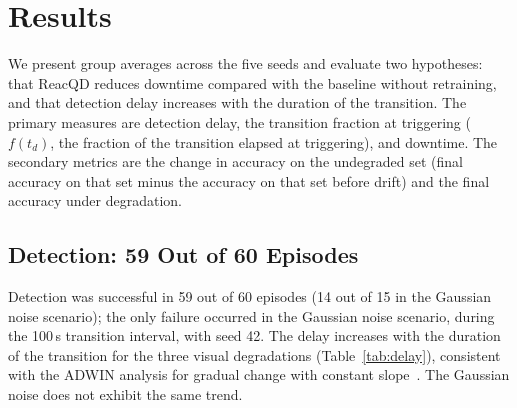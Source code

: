 \documentclass[conference]{IEEEtran}
\begin{document}
\begin{table}[!t]
\centering
\caption{Fixed configuration for each episode.}
\label{tab:setup}
\end{table}
\section{Results}
We present group averages across the five seeds and evaluate two hypotheses: that ReacQD reduces downtime compared with the baseline without retraining, and that detection delay increases with the duration of the transition. The primary measures are detection delay, the transition fraction at triggering ($f(t_d)$, the fraction of the transition elapsed at triggering), and downtime. The secondary metrics are the change in accuracy on the undegraded set (final accuracy on that set minus the accuracy on that set before drift) and the final accuracy under degradation.

\subsection{Detection: 59 Out of 60 Episodes}
Detection was successful in 59 out of 60 episodes (14 out of 15 in the Gaussian noise scenario); the only failure occurred in the Gaussian noise scenario, during the 100\,s transition interval, with seed 42. The delay increases with the duration of the transition for the three visual degradations (Table~\ref{tab:delay}), consistent with the ADWIN analysis for gradual change with constant slope~\cite{bifet2007}. The Gaussian noise does not exhibit the same trend.
\end{document}

